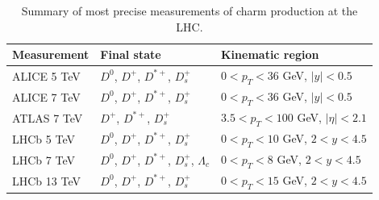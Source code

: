 \documentclass[12pt,a4paper]{article}
\newcommand{\dz}{\ensuremath{D^0}\xspace}
\newcommand{\dch}{\ensuremath{D^{+}}\xspace}
\newcommand{\dstar}{\ensuremath{D^{*+}}\xspace}
\newcommand{\ds}{\ensuremath{D_s^{+}}\xspace}
\newcommand{\lamc}{\ensuremath{\Lambda_{c}}\xspace}
\begin{document}
\begin{table}
\setlength{\tabcolsep}{8pt}
\renewcommand{\arraystretch}{1.35}
\begin{tabular}{lll}
    \hline
    Measurement & Final state & Kinematic region \\
    \hline
    ALICE 5 TeV~\cite{Acharya:2019mgn} & \dz, \dch, \dstar, \ds & $0 < p_T < 36$ GeV, $|y|<0.5$ \\
    ALICE 7 TeV~\cite{Acharya:2019mgn} & \dz, \dch, \dstar, \ds & $0 < p_T < 36$ GeV, $|y|<0.5$ \\
    ATLAS 7 TeV~\cite{Aad:2015zix} & \dch, \dstar, \ds & $3.5 < p_T < 100$ GeV, $|\eta|<2.1$ \\
    LHCb 5 TeV~\cite{Aaij:2016jht} & \dz, \dch, \dstar, \ds & $0 < p_T < 10$ GeV, $2<y<4.5$ \\
    LHCb 7 TeV~\cite{Aaij:2013mga} & \dz, \dch, \dstar, \ds, \lamc & $0 < p_T < 8$ GeV, $2<y<4.5$ \\
    LHCb 13 TeV~\cite{Aaij:2015bpa} & \dz, \dch, \dstar, \ds & $0 < p_T < 15$ GeV, $2<y<4.5$ \\
    \hline
\end{tabular}
\caption{Summary of most precise measurements of charm production at the LHC.}
\label{tab:charmdata}
\end{table}
\end{document}
